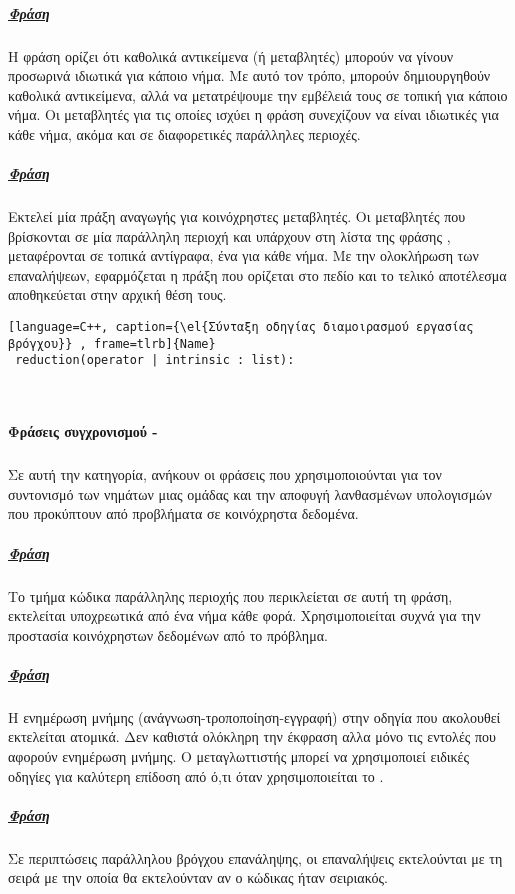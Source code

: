 \subparagraph{\underline{Φράση }}
\subparagraph{}
Η φράση \emph{} ορίζει ότι καθολικά αντικείμενα (ή μεταβλητές) μπορούν να γίνουν προσωρινά ιδιωτικά
για κάποιο νήμα. Με αυτό τον τρόπο, μπορούν δημιουργηθούν καθολικά αντικείμενα, αλλά να μετατρέψουμε την εμβέλειά τους
σε τοπική για κάποιο νήμα. Οι μεταβλητές για τις οποίες ισχύει η φράση \emph{} συνεχίζουν να είναι
ιδιωτικές για κάθε νήμα, ακόμα και σε διαφορετικές παράλληλες περιοχές\cite{pdplab}.
\clearpage
\subparagraph{\underline{Φράση }}
\subparagraph{}
Εκτελεί μία πράξη αναγωγής για κοινόχρηστες μεταβλητές. Οι μεταβλητές που βρίσκονται σε μία παράλληλη περιοχή και
υπάρχουν στη λίστα της φράσης \emph{}, μεταφέρονται σε τοπικά αντίγραφα, ένα για κάθε νήμα. Με την
ολοκλήρωση των επαναλήψεων, εφαρμόζεται η πράξη που ορίζεται στο πεδίο \emph{} και το τελικό αποτέλεσμα
αποθηκεύεται στην αρχική θέση τους\cite{pdplab}.
\begin{lstlisting}[language=C++, caption={\el{Σύνταξη οδηγίας διαμοιρασμού εργασίας βρόγχου}} , frame=tlrb]{Name}
 reduction(operator | intrinsic : list):\end{lstlisting}

\ \\
\paragraph{Φράσεις συγχρονισμού - \emph{}}
\subparagraph{}
Σε αυτή την κατηγορία, ανήκουν οι φράσεις που χρησιμοποιούνται για τον συντονισμό των νημάτων μιας ομάδας και την
αποφυγή λανθασμένων υπολογισμών που προκύπτουν από προβλήματα \textbf{} σε κοινόχρηστα δεδομένα.

\subparagraph{\underline{Φράση }}
\subparagraph{}
Το τμήμα κώδικα παράλληλης περιοχής που περικλείεται σε αυτή τη φράση, εκτελείται υποχρεωτικά από ένα νήμα κάθε φορά.
Χρησιμοποιείται συχνά για την προστασία κοινόχρηστων δεδομένων από το \emph{} πρόβλημα.

\subparagraph{\underline{Φράση }}
\subparagraph{}
H ενημέρωση μνήμης (ανάγνωση-τροποποίηση-εγγραφή) στην οδηγία που ακολουθεί εκτελείται ατομικά. Δεν καθιστά ολόκληρη την
έκφραση \emph{} αλλα μόνο τις εντολές που αφορούν ενημέρωση μνήμης. Ο μεταγλωττιστής μπορεί να χρησιμοποιεί
ειδικές οδηγίες \emph{} για καλύτερη επίδοση από ό,τι όταν χρησιμοποιείται το \emph{}.
\clearpage
\subparagraph{\underline{Φράση }}
\subparagraph{}
Σε περιπτώσεις παράλληλου βρόγχου επανάληψης, οι επαναλήψεις εκτελούνται με τη σειρά με την οποία θα εκτελούνταν αν ο
κώδικας ήταν σειριακός.

